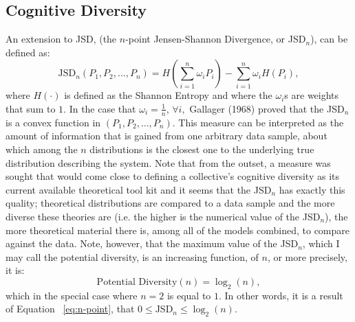 \documentclass[12pt]{article}
\begin{document}
\subsection{Cognitive Diversity}
An extension to JSD, (the $n$-point Jensen-Shannon Divergence, or JSD$_n$), can be defined as:
\begin{equation} \label{eq:n-point}
\text{JSD}_n(P_1, P_2, \ldots, P_n)=H\left(\sum_{i=1}^n \omega_i P_i\right)-\sum_{i=1}^n \omega_i H(P_i),
\end{equation}
where $H(\cdot)$ is defined as the Shannon Entropy and where the $\omega_i$s are weights that sum to $1$. In the case that $\omega_i=\frac{1}{n}$, $\forall i,$ Gallager (1968) proved that the JSD$_n$ is a convex function in $(P_1, P_2, \ldots, P_n).$ This measure can be interpreted as the amount of information that is gained from one arbitrary data sample, about which among the $n$ distributions is the closest one to the underlying true distribution describing the system. Note that from the outset, a measure was sought that would come close to defining a collective's cognitive diversity as its current available theoretical tool kit and it seems that the JSD$_n$ has exactly this quality; theoretical distributions are compared to a data sample and the more diverse these theories are (i.e. the higher is the numerical value of the JSD$_n$), the more theoretical material there is, among all of the models combined, to compare against the data. Note, however, that the maximum value of the JSD$_n$, which I may call the potential diversity, is an increasing function, of $n$, or more precisely, it is:
\begin{equation} \label{eq:potential}
\text{Potential Diversity}(n)=\log_2(n),
\end{equation}
which in the special case where $n=2$ is equal to $1$. In other words, it is a result of Equation ~\ref{eq:n-point}, that $0 \leq \text{JSD}_n \leq \log_2(n).$
\end{document}
